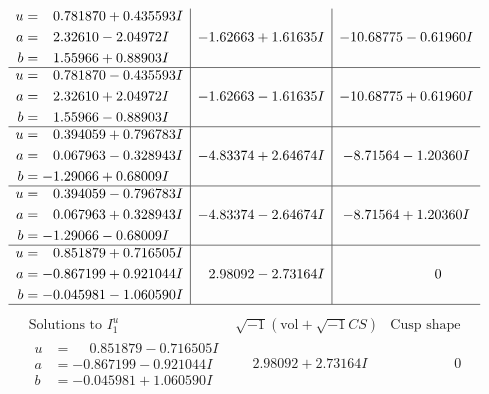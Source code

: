 \documentclass[1p]{elsarticle_modified}
\theoremstyle{definition}
\newcommand{\I}{\sqrt{-1}}
\begin{document}
$$\begin{array}{c|c|c}
\begin{aligned}
u &= \phantom{-}0.781870 + 0.435593 I \\
a &= \phantom{-}2.32610 - 2.04972 I \\
b &= \phantom{-}1.55966 + 0.88903 I\end{aligned}
 & -1.62663 + 1.61635 I & -10.68775 - 0.61960 I \\ \hline\begin{aligned}
u &= \phantom{-}0.781870 - 0.435593 I \\
a &= \phantom{-}2.32610 + 2.04972 I \\
b &= \phantom{-}1.55966 - 0.88903 I\end{aligned}
 & -1.62663 - 1.61635 I & -10.68775 + 0.61960 I \\ \hline\begin{aligned}
u &= \phantom{-}0.394059 + 0.796783 I \\
a &= \phantom{-}0.067963 - 0.328943 I \\
b &= -1.29066 + 0.68009 I\end{aligned}
 & -4.83374 + 2.64674 I & -8.71564 - 1.20360 I \\ \hline\begin{aligned}
u &= \phantom{-}0.394059 - 0.796783 I \\
a &= \phantom{-}0.067963 + 0.328943 I \\
b &= -1.29066 - 0.68009 I\end{aligned}
 & -4.83374 - 2.64674 I & -8.71564 + 1.20360 I \\ \hline\begin{aligned}
u &= \phantom{-}0.851879 + 0.716505 I \\
a &= -0.867199 + 0.921044 I \\
b &= -0.045981 - 1.060590 I\end{aligned}
 & \phantom{-}2.98092 - 2.73164 I & \phantom{-0.000000 } 0\\
 \hline 
 \end{array}$$\newpage$$\begin{array}{c|c|c}  
\text{Solutions to }I^u_{1}& \I (\text{vol} + \sqrt{-1}CS) & \text{Cusp shape}\\
 \hline 
\begin{aligned}
u &= \phantom{-}0.851879 - 0.716505 I \\
a &= -0.867199 - 0.921044 I \\
b &= -0.045981 + 1.060590 I\end{aligned}
 & \phantom{-}2.98092 + 2.73164 I & \phantom{-0.000000 } 0 \\ \hline\begin{aligned}

\end{aligned}
\end{array}$$
\end{document}
